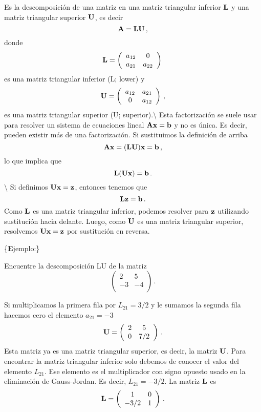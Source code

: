 \documentclass[
]{agujournal2019}
\begin{document}
\noindent Es la descomposición de una matriz en una matriz triangular
inferior \({\textbf L}\) y una matriz triangular superior
\({\textbf U}\), es decir \[{\textbf A}={\textbf L}{\textbf U}\,,\]
donde \[{\textbf L}=\left(\begin{array}{cccc}
  a_{12} & 0\\
  a_{21} & a_{22}\\
\end{array}\right)\,\] es una matriz triangular inferior (L; lower) y \[
{\textbf U}=\left(\begin{array}{cccc}
  a_{12} & a_{21}\\
  0 & a_{12}\\
\end{array}\right)\,,\] es una matriz triangular superior (U;
superior).\textbackslash{} Esta factorización se suele usar para
resolver un sistema de ecuaciones lineal
\({\textbf A}{\textbf x}={\textbf b}\) y no es única. Es decir, pueden
existir más de una factorización. Si sustituimos la definición de arriba
\[{\textbf A}{\textbf x}=({\textbf L}{\textbf U}){\textbf x}={\textbf b}\,,\]
lo que implica que
\[{\textbf L}({\textbf U}{\textbf x})={\textbf b}\,.\] \textbackslash{}
Si definimos \({\textbf U}{\textbf x}={\textbf z}\), entonces tenemos
que \[{\textbf L}{\textbf z}={\textbf b}\,.\] Como \({\textbf L}\) es
una matriz triangular inferior, podemos resolver para \({\textbf z}\)
utilizando sustitución hacia delante. Luego, como \({\textbf U}\) es una
matriz triangular superior, resolvemos
\({\textbf U}{\textbf x}={\textbf z}\) por sustitución en reversa.

\vspace{0.5cm}

\{\noindent \textbf Ejemplo:\}

\noindent Encuentre la descomposición LU de la matriz
\[\left(\begin{array}{ccccc}
  2 & 5\\
 -3 & -4\\
        \end{array}\right)\,.
\]

\noindent Si multiplicamos la primera fila por \(L_{21}=3/2\) y le
sumamos la segunda fila hacemos cero el elemento \(a_{21}=-3\)
\[{\textbf U}=\left(\begin{array}{ccccc}
  2 & 5\\
 0 & 7/2\\
        \end{array}\right)\,.
\] Esta matriz ya es una matriz triangular superior, es decir, la matriz
\({\textbf U}\). Para encontrar la matriz triangular inferior solo
debemos de conocer el valor del elemento \(L_{21}\). Ese elemento es el
multiplicador con signo opuesto usado en la eliminación de Gauss-Jordan.
Es decir, \(L_{21}=-3/2\). La matriz \({\textbf L}\) es
\[{\textbf L}=\left(\begin{array}{ccccc}
  1 & 0\\
 -3/2 & 1\\
        \end{array}\right)\,.\]
\end{document}
